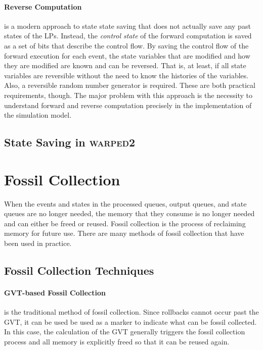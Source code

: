 \documentclass[11pt]{book}
\begin{document}
\paragraph{Reverse Computation} is a modern approach to state state saving that does not
actually save any past states of the LPs. Instead, the \emph{control state} of the forward
computation is saved as a set of bits that describe the control flow. By saving the control
flow of the forward execution for each event, the state variables that are modified and
how they are modified are known and can be reversed. That is, at least, if all state variables
are reversible without the need to know the histories of the variables. Also, a reversible
random number generator is required. These are both practical requirements, though. The major
problem with this approach is the necessity to understand forward and reverse computation
precisely in the implementation of the simulation model.

\subsection{State Saving in \textsc{warped2}}



\section{Fossil Collection}

When the events and states in the processed queues, output queues, and state queues are
no longer needed, the memory that they consume is no longer needed and can either be freed
or reused. Fossil collection is the process of reclaiming memory for future use. There
are many methods of fossil collection that have been used in practice.

\subsection{Fossil Collection Techniques}

\paragraph{GVT-based Fossil Collection} is the traditional method of fossil collection.
Since rollbacks cannot occur past the GVT, it can be used be used as a marker to indicate
what can be fossil collected. In this case, the calculation of the GVT generally triggers
the fossil collection process and all memory is explicitly freed so that it can be reused
again.
\end{document}
